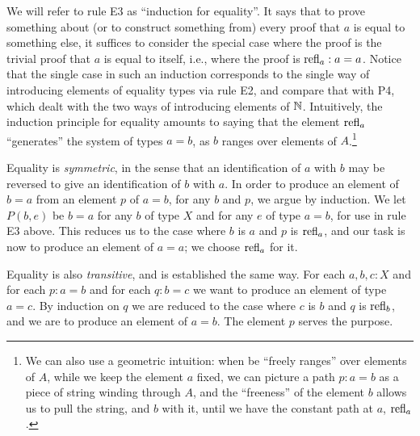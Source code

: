 We will refer to rule E3 as ``induction for equality''.  It says that to prove something about (or to construct something from) every proof that
$a$ is equal to something else, it suffices to consider the special case where the proof is the trivial proof that $a$ is equal to itself, i.e.,
where the proof is $\refl a : a=a$.  Notice that the single case in such an induction corresponds to the single way of introducing elements of
equality types via rule E2, and compare that with P4, which dealt with the two ways of introducing elements of $\mathbb{N}$.
Intuitively, the induction principle for equality amounts to saying that the element $\refl a$ ``generates'' the system of types $a=b$, as $b$
ranges over elements of $A$.\footnote{%
  We can also use a geometric intuition: when be ``freely ranges'' over elements of $A$,
  while we keep the element $a$ fixed, we can picture a path $p : a=b$ as a piece of string
  winding through $A$, and the ``freeness'' of the element $b$ allows us to pull the string,
  and $b$ with it, until we have the constant path at $a$, $\refl a$.\par
  }

Equality is {\em symmetric}, in the sense that an identification of $a$ with $b$ may be reversed to give an identification of $b$ with $a$.  In
order to produce an element of $b=a$ from an element $p$ of $a=b$, for any $b$ and $p$, we argue by induction.  We let $P(b,e)$ be $b=a$ for any
$b$ of type $X$ and for any $e$ of type $a=b$, for use in rule E3 above. 
This reduces us to the case where $b$ is $a$ and $p$ is $\refl a$, and
our task is now to produce an element of $a=a$; we choose $\refl a$ for it.

Equality is also {\em transitive}, and is established the same way.  
For each $a,b,c:X$ and for each $p:a=b$ and for each $q:b=c$ we want to produce an
element of type $a=c$.  By induction on $q$ we are reduced to the case where $c$ is $b$ and $q$ is $\refl b$, and we are to produce an element
of $a=b$.  The element $p$ serves the purpose.  

